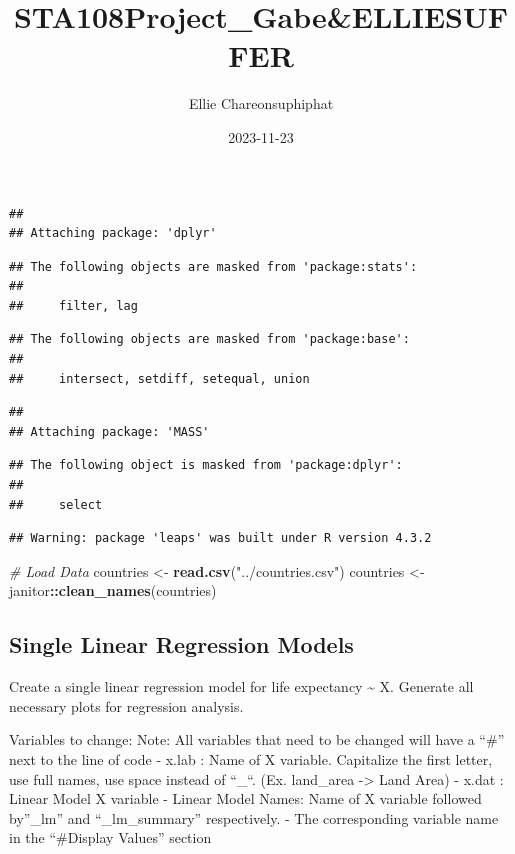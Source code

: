 \documentclass[
]{article}
\title{STA108Project\_Gabe\&ELLIESUFFER}
\author{Ellie Chareonsuphiphat}
\date{2023-11-23}
\newenvironment{Shaded}{\begin{snugshade}}{\end{snugshade}}
\newcommand{\CommentTok}[1]{\textcolor[rgb]{0.56,0.35,0.01}{\textit{#1}}}
\newcommand{\FunctionTok}[1]{\textcolor[rgb]{0.13,0.29,0.53}{\textbf{#1}}}
\newcommand{\NormalTok}[1]{#1}
\newcommand{\OtherTok}[1]{\textcolor[rgb]{0.56,0.35,0.01}{#1}}
\newcommand{\SpecialCharTok}[1]{\textcolor[rgb]{0.81,0.36,0.00}{\textbf{#1}}}
\newcommand{\StringTok}[1]{\textcolor[rgb]{0.31,0.60,0.02}{#1}}
\begin{document}
\maketitle

\begin{verbatim}
## 
## Attaching package: 'dplyr'
\end{verbatim}

\begin{verbatim}
## The following objects are masked from 'package:stats':
## 
##     filter, lag
\end{verbatim}

\begin{verbatim}
## The following objects are masked from 'package:base':
## 
##     intersect, setdiff, setequal, union
\end{verbatim}

\begin{verbatim}
## 
## Attaching package: 'MASS'
\end{verbatim}

\begin{verbatim}
## The following object is masked from 'package:dplyr':
## 
##     select
\end{verbatim}

\begin{verbatim}
## Warning: package 'leaps' was built under R version 4.3.2
\end{verbatim}

\begin{Shaded}
\begin{Highlighting}[]
\CommentTok{\# Load Data}
\NormalTok{countries }\OtherTok{\textless{}{-}} \FunctionTok{read.csv}\NormalTok{(}\StringTok{"../countries.csv"}\NormalTok{)}
\NormalTok{countries }\OtherTok{\textless{}{-}}\NormalTok{ janitor}\SpecialCharTok{::}\FunctionTok{clean\_names}\NormalTok{(countries)}
\end{Highlighting}
\end{Shaded}

\hypertarget{single-linear-regression-models}{%
\subsection{Single Linear Regression
Models}\label{single-linear-regression-models}}

Create a single linear regression model for life expectancy
\textasciitilde{} X. Generate all necessary plots for regression
analysis.

Variables to change: Note: All variables that need to be changed will
have a ``\#'' next to the line of code - x.lab : Name of X variable.
Capitalize the first letter, use full names, use space instead of
``\_``. (Ex. land\_area -\textgreater{} Land Area) - x.dat : Linear
Model X variable - Linear Model Names: Name of X variable followed
by''\_lm'' and ``\_lm\_summary'' respectively. - The corresponding
variable name in the ``\#Display Values'' section
\end{document}
